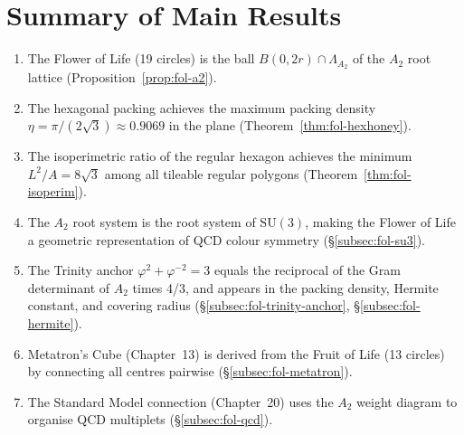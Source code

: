 \section{Summary of Main Results}
\label{sec:fol-summary}

\begin{enumerate}
\item The Flower of Life (19 circles) is the ball \(B(0,2r)\cap\Lambda_{A_2}\)
      of the \(A_2\) root lattice (Proposition~\ref{prop:fol-a2}).
\item The hexagonal packing achieves the maximum packing density
      \(\eta=\pi/(2\sqrt{3})\approx 0.9069\) in the plane
      (Theorem~\ref{thm:fol-hexhoney}).
\item The isoperimetric ratio of the regular hexagon achieves the minimum
      \(L^2/A=8\sqrt{3}\) among all tileable regular polygons
      (Theorem~\ref{thm:fol-isoperim}).
\item The \(A_2\) root system is the root system of \(\mathrm{SU}(3)\),
      making the Flower of Life a geometric representation of QCD colour
      symmetry (§\ref{subsec:fol-su3}).
\item The Trinity anchor \(\varphi^2+\varphi^{-2}=3\) equals the
      reciprocal of the Gram determinant of \(A_2\) times 4/3, and appears
      in the packing density, Hermite constant, and covering radius
      (§\ref{subsec:fol-trinity-anchor}, §\ref{subsec:fol-hermite}).
\item Metatron's Cube (Chapter~13) is derived from the Fruit of Life
      (13 circles) by connecting all centres pairwise
      (§\ref{subsec:fol-metatron}).
\item The Standard Model connection (Chapter~20) uses the \(A_2\) weight
      diagram to organise QCD multiplets (§\ref{subsec:fol-qcd}).
\end{enumerate}
